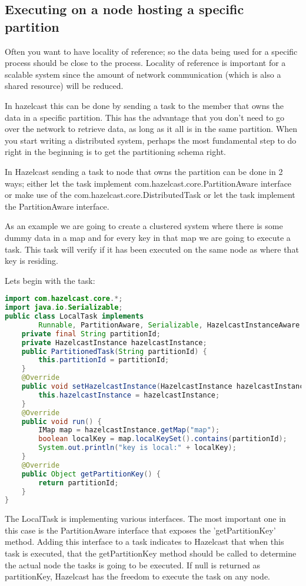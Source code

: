 \subsection{Executing on a node hosting a specific partition}
Often you want to have locality of reference; so the data being used for a specific process should be close to the process. Locality of reference is important for a scalable system since the amount of network communication (which is also a shared resource) will be reduced.

In hazelcast this can be done by sending a task to the member that owns the data in a specific partition. This has the advantage that you don't need to go over the network to retrieve data, as long as it all is in the same partition. When you start writing a distributed system, perhaps the most fundamental step to do right in the beginning is to get the partitioning schema right.

In Hazelcast sending a task to node that owns the partition can be done in 2 ways; either let the task implement com.hazelcast.core.PartitionAware interface or make use of the com.hazelcast.core.DistributedTask or let the task implement the PartitionAware interface.

As an example we are going to create a clustered system where there is some dummy data in a map and for every key in that map we are going to execute a task. This task will verify if it has been executed on the same node as where that key is residing.

Lets begin with the task:
\begin{lstlisting}[language=java]
import com.hazelcast.core.*;
import java.io.Serializable;
public class LocalTask implements
        Runnable, PartitionAware, Serializable, HazelcastInstanceAware {
    private final String partitionId;
    private HazelcastInstance hazelcastInstance;
    public PartitionedTask(String partitionId) {
        this.partitionId = partitionId;
    }
    @Override
    public void setHazelcastInstance(HazelcastInstance hazelcastInstance) {
        this.hazelcastInstance = hazelcastInstance;
    }
    @Override
    public void run() {
        IMap map = hazelcastInstance.getMap("map");
        boolean localKey = map.localKeySet().contains(partitionId);
        System.out.println("key is local:" + localKey);
    }
    @Override
    public Object getPartitionKey() {
        return partitionId;
    }
}
\end{lstlisting}
The LocalTask is implementing various interfaces. The most important one in this case is the PartitionAware interface that exposes the 'getPartitionKey' method. Adding this interface to a task indicates to Hazelcast that when this task is executed, that the getPartitionKey method should be called to determine the actual node the tasks is going to be executed. If null is returned as partitionKey, Hazelcast has the freedom to execute the task on any node.

